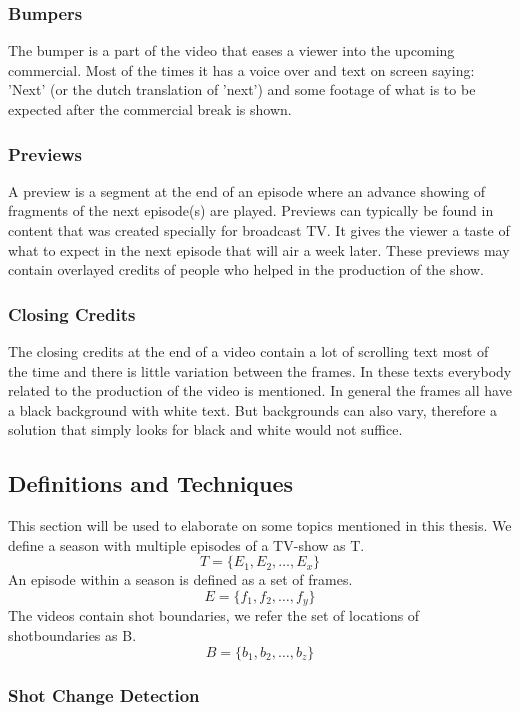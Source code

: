 \documentclass{article}
\begin{document}
\subsubsection{Bumpers}
The bumper is a part of the video that eases a viewer into the upcoming commercial. Most of the times it has a voice over and text on screen saying: 'Next' (or the dutch translation of 'next') and some footage of what is to be expected after the commercial break is shown.

\subsubsection{Previews}
A preview is a segment at the end of an episode where an advance showing of fragments of the next episode(s) are played. Previews can typically be found in content that was created specially for broadcast TV. It gives the viewer a taste of what to expect in the next episode that will air a week later. These previews may contain overlayed credits of people who helped in the production of the show.

\subsubsection{Closing Credits}
The closing credits at the end of a video contain a lot of scrolling text most of the time and there is little variation between the frames. In these texts everybody related to the production of the video is mentioned. In general the frames all have a black background with white text. But backgrounds can also vary, therefore a solution that simply looks for black and white would not suffice.

\subsection{Definitions and Techniques}
This section will be used to elaborate on some topics mentioned in this thesis. We define a season with multiple episodes of a TV-show as T.
\[T = \{E_1, E_2, \dots, E_x\}\]
An episode within a season is defined as a set of frames.
\[E = \{f_1, f_2, \dots, f_y\}\]
The videos contain shot boundaries, we refer the set of locations of shotboundaries as B.
\[B = \{b_1, b_2, \dots, b_z\}\]

\subsubsection{Shot Change Detection}
\end{document}
